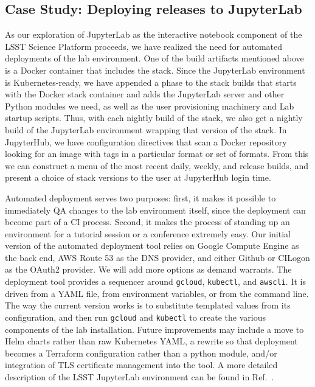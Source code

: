 \subsection{Case Study: Deploying releases to JupyterLab}
\label{sec:jupyterlab}

As our exploration of JupyterLab as the interactive notebook component
of the LSST Science Platform\cite{LSE-319} proceeds, we have realized the need for
automated deployments of the lab environment.
One of the build artifacts mentioned above is a Docker container that includes the stack.
Since the
JupyterLab environment is Kubernetes-ready, we have appended a phase to
the stack builds that starts with the Docker stack container and adds
the JupyterLab server and other Python modules we need, as well as the
user provisioning machinery and Lab startup scripts.  Thus, with each
nightly build of the stack, we also get a nightly build of the
JupyterLab environment wrapping that version of the stack.  In
JupyterHub, we have configuration directives that scan a Docker
repository looking for an image with tags in a particular format or set
of formats.  From this we can construct a menu of the most recent daily,
weekly, and release builds, and present a choice of stack versions to
the user at JupyterHub login time.

Automated deployment serves two
purposes: first, it makes it possible to immediately QA changes to the
lab environment itself, since the deployment can become part of a CI
process.  Second, it makes the process of standing up an environment for
a tutorial session or a conference extremely easy.  Our initial version
of the automated deployment tool relies on Google Compute Engine as the
back end, AWS Route 53 as the DNS provider, and either Github or CILogon
as the OAuth2 provider.  We will add more options as demand warrants.
The deployment tool provides a sequencer around \texttt{gcloud}, \texttt{kubectl}, and
\texttt{awscli}.  It is driven from a YAML file, from environment variables, or
from the command line.  The way the current version works is to
substitute templated values from its configuration, and then run \texttt{gcloud}
and \texttt{kubectl} to create the various components of the lab installation.
Future improvements may include a move to Helm charts rather than raw
Kubernetes YAML, a rewrite so that deployment becomes a Terraform
configuration rather than a python module, and/or integration of TLS
certificate management into the tool.
 A more detailed description of the LSST JupyterLab environment can be found in Ref.~.
